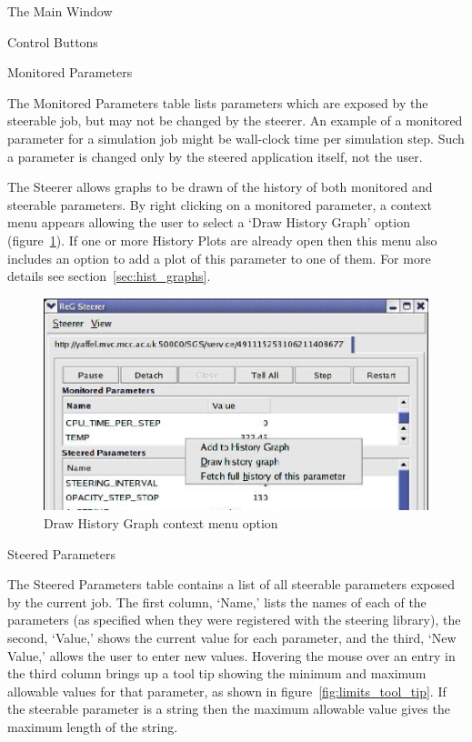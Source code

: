 \documentclass[a4paper,twoside]{article}
\begin{document}
\begin{section}{The Main Window}
\begin{subsection}{Control Buttons}
\end{subsection} %


\begin{subsection}{Monitored Parameters}
\label{sec:mon_params}

The Monitored Parameters table lists parameters which are exposed by
the steerable job, but may not be changed by the steerer. An example
of a monitored parameter for a simulation job might be wall-clock time
per simulation step. Such a parameter is changed only by the steered
application itself, not the user.

The Steerer allows graphs to be drawn of the history of both monitored
and steerable parameters. By right clicking on a monitored parameter,
a context menu appears allowing the user to select a `Draw History
Graph' option (figure~\ref{fig:hist_graph_context_menu}). If one or
more History Plots are already open then this menu also includes an
option to add a plot of this parameter to one of them. For more
details see section~\ref{sec:hist_graphs}.

\begin{figure}
\centerline{\includegraphics{hist_plot_context_menu.eps}}
\caption{Draw History Graph context menu option}
\label{fig:hist_graph_context_menu}
\end{figure}

\end{subsection} %


\begin{subsection}{Steered Parameters}
\label{sec:steered_params}

The Steered Parameters table contains a list of all steerable
parameters exposed by the current job. The first column, `Name,' lists
the names of each of the parameters (as specified when they were
registered with the steering library), the second, `Value,' shows the
current value for each parameter, and the third, `New Value,' allows
the user to enter new values. Hovering the mouse over an entry in the
third column brings up a tool tip showing the minimum and maximum
allowable values for that parameter, as shown in
figure~\ref{fig:limits_tool_tip}.  If the steerable parameter is a
string then the maximum allowable value gives the maximum length of
the string.


\end{subsection}
\end{section}
\end{document}
